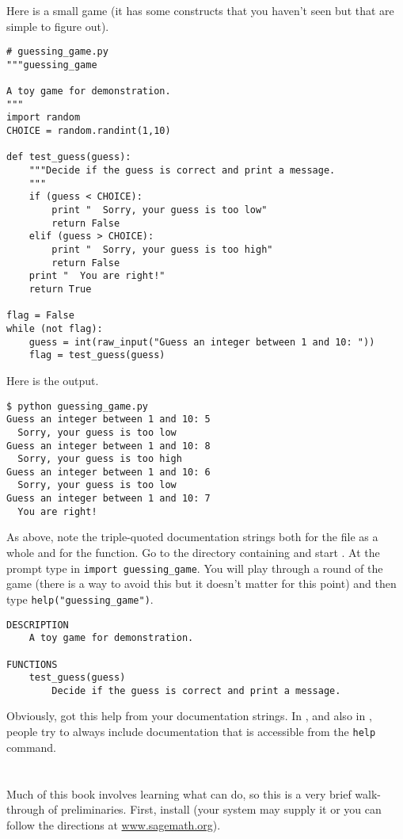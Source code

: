 Here is a small game (it has some \python{} constructs that
you haven't seen but that are simple to figure out).
\begin{lstlisting}[style=python]
# guessing_game.py
"""guessing_game

A toy game for demonstration.
"""
import random
CHOICE = random.randint(1,10)

def test_guess(guess):
    """Decide if the guess is correct and print a message.
    """
    if (guess < CHOICE):
        print "  Sorry, your guess is too low"
        return False
    elif (guess > CHOICE):
        print "  Sorry, your guess is too high"
        return False
    print "  You are right!"
    return True

flag = False
while (not flag):
    guess = int(raw_input("Guess an integer between 1 and 10: "))
    flag = test_guess(guess)
\end{lstlisting}
Here is the output.
\begin{lstlisting}
$ python guessing_game.py
Guess an integer between 1 and 10: 5
  Sorry, your guess is too low
Guess an integer between 1 and 10: 8
  Sorry, your guess is too high
Guess an integer between 1 and 10: 6
  Sorry, your guess is too low
Guess an integer between 1 and 10: 7
  You are right!
\end{lstlisting}  %

As above, note the triple-quoted documentation strings both for the 
file as a whole and for the function.
Go to the directory containing  and start \python{}.
At the prompt type in \lstinline[style=inline]!import guessing_game!.
You will play through a round of the game (there is a way to avoid this
but it doesn't matter for this point) and then type
\lstinline[style=inline]!help("guessing_game")!.
\begin{lstlisting}
DESCRIPTION
    A toy game for demonstration.

FUNCTIONS
    test_guess(guess)
        Decide if the guess is correct and print a message. 
\end{lstlisting}
Obviously, \python{} got this help from your documentation strings.
In \python{}, and also in \sage, people try to always include documentation
that is accessible from the \lstinline[style=inline]!help! command.




\section{\sage}
Much of this book involves learning what \sage{} can do, so this is a very
brief walk-through of preliminaries.
First, install \sage{} (your system may supply it or you can
follow the directions at
\href{http://www.sagemath.org}{www.sagemath.org}).

